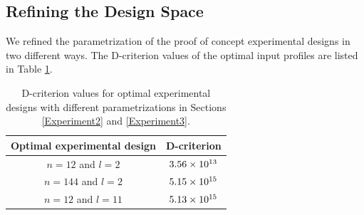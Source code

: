 \subsection{Refining the Design Space}
We refined the parametrization of the proof of concept experimental designs in two different ways. The D-criterion values of the optimal input profiles are listed in Table \ref{table2}.
\label{Refinement}
\begin{table}
	\centering
	\begin{tabular}{|c|c|}
		\hline 
		Optimal experimental design & D-criterion \\ 
		\hline 
		$n = 12$ and $l = 2$& $3.56\times 10^{13}$  \\ 
		
		$n = 144$ and $l = 2$& $5.15\times 10^{15}$ \\ 
		
		$n = 12$ and $l= 11$& $5.13\times 10^{15}$ \\ 
		\hline
	\end{tabular} 
	\caption{D-criterion values for optimal experimental designs with different parametrizations  in Sections \ref{Experiment2} and \ref{Experiment3}.} 
	\label{table2}
\end{table}

